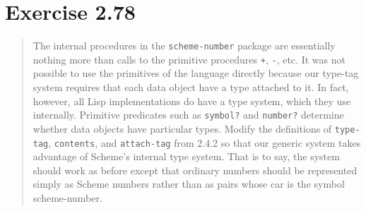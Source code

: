 \documentclass{article}
\begin{document}
\section{Exercise 2.78}
\begin{quote}
    The internal procedures in the \texttt{scheme-number} package are
    essentially nothing more than calls to the primitive procedures \texttt{+},
    \texttt{-}, etc. It was not possible to use the primitives of the language
    directly because our type-tag system requires that each data object have a
    type attached to it. In fact, however, all Lisp implementations do have a
    type system, which they use internally. Primitive predicates such as
    \texttt{symbol?} and \texttt{number?} determine whether data objects have
    particular types. Modify the definitions of \texttt{type-tag},
    \texttt{contents}, and \texttt{attach-tag} from 2.4.2 so that our generic
    system takes advantage of Scheme's internal type system. That is to say,
    the system should work as before except that ordinary numbers should be
    represented simply as Scheme numbers rather than as pairs whose car is the
    symbol scheme-number.
\end{quote}


\end{document}
